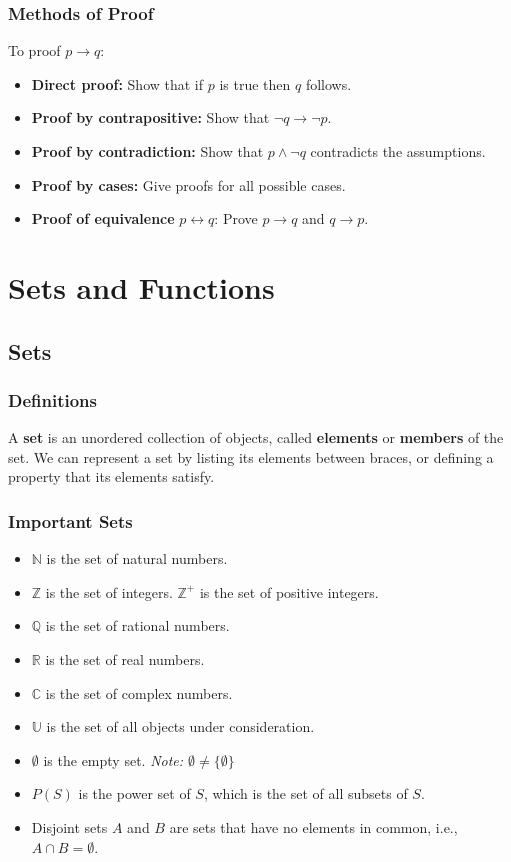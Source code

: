 \documentclass[a4paper,12pt]{article}
\begin{document}
\subsubsection{Methods of Proof}

To proof $p \rightarrow q$:
\begin{itemize}
	\item \textbf{Direct proof:} Show that if $p$ is true then $q$ follows.
	\item \textbf{Proof by contrapositive:} Show that $\neg q \rightarrow \neg p$.
	\item \textbf{Proof by contradiction:} Show that $p \wedge \neg q$ contradicts the assumptions.
	\item \textbf{Proof by cases:} Give proofs for all possible cases.
	\item \textbf{Proof of equivalence} $p \leftrightarrow q$: Prove $p \rightarrow q$ and $q \rightarrow p$.
\end{itemize}

\section{Sets and Functions}

\subsection{Sets}

\subsubsection{Definitions}

A \textbf{set} is an unordered collection of objects, called \textbf{elements} or \textbf{members} of the set.
We can represent a set by listing its elements between braces, or defining a property that its elements satisfy.

\subsubsection{Important Sets}

\begin{itemize}
	\item $\mathbb{N}$ is the set of natural numbers.
	\item $\mathbb{Z}$ is the set of integers. $\mathbb{Z^+}$ is the set of positive integers.
	\item $\mathbb{Q}$ is the set of rational numbers.
	\item $\mathbb{R}$ is the set of real numbers.
	\item $\mathbb{C}$ is the set of complex numbers.
	\item $\mathbb{U}$ is the set of all objects under consideration.
	\item $\emptyset$ is the empty set. \textit{Note: $\emptyset \neq \{\emptyset\}$}
	\item $P(S)$ is the power set of $S$, which is the set of all subsets of $S$.
	\item Disjoint sets $A$ and $B$ are sets that have no elements in common, i.e., $A \cap B = \emptyset$.
\end{itemize}
\end{document}
